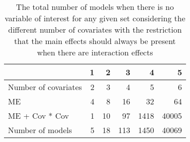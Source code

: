 \begin{table}[!h]
\centering
\caption{The total number of models when there is no variable of interest for any given set considering the different number of covariates with the restriction that the main effects should always be present when there are interaction effects} 
\begin{tabular}{lrrrrr}
  \hline
 & 1 & 2 & 3 & 4 & 5 \\ 
  \hline
Number of covariates & 2 & 3 & 4 & 5 & 6 \\ 
  ME & 4 & 8 & 16 & 32 & 64 \\ 
  ME + Cov * Cov & 1 & 10 & 97 & 1418 & 40005 \\ 
  Number of models & 5 & 18 & 113 & 1450 & 40069 \\ 
   \hline
\end{tabular}
\end{table}
